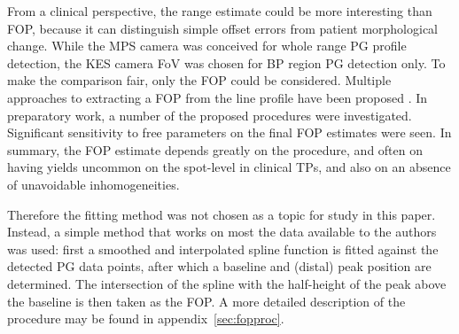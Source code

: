 \documentclass[a4paper,english]{article}
\begin{document}
From a clinical perspective, the range estimate could be more interesting than FOP, because it can distinguish simple offset errors from patient morphological change. While the MPS camera was conceived for whole range PG profile detection, the KES camera FoV was chosen for BP region PG detection only. To make the comparison fair, only the FOP could be considered. Multiple approaches to extracting a FOP from the line profile have been proposed \citep{Smeets2012,Gueth2013,Roellinghoff2014a,Janssen2014,Sterpin2015}. In preparatory work, a number of the proposed procedures were investigated. Significant sensitivity to free parameters on the final FOP estimates were seen. In summary, the FOP estimate depends greatly on the procedure, and often on having yields uncommon on the spot-level in clinical TPs, and also on an absence of unavoidable inhomogeneities.

Therefore the fitting method was not chosen as a topic for study in this paper. Instead, a simple method that works on most the data available to the authors was used: first a smoothed and interpolated spline function is fitted against the detected PG data points, after which a baseline and (distal) peak position are determined. The intersection of the spline with the half-height of the peak above the baseline is then taken as the FOP. A more detailed description of the procedure may be found in appendix~\ref{sec:fopproc}.
\end{document}
